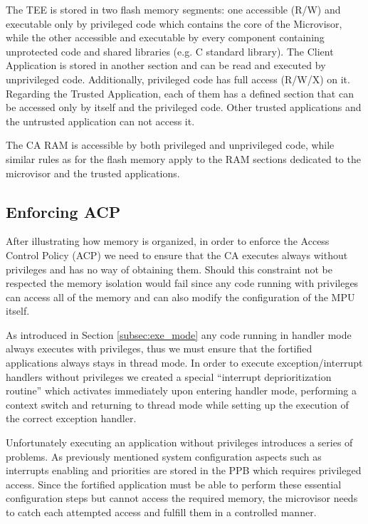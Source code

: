 \documentclass{article}
\begin{document}
The TEE is stored in two flash memory segments: one accessible (R/W) and executable only by privileged code which contains the core of the Microvisor, while the other accessible and executable by every component containing unprotected code and shared libraries (e.g. C standard library). The Client Application is stored in another section and can be read and executed by unprivileged code. Additionally, privileged code has full access (R/W/X) on it. Regarding the Trusted Application, each of them has a defined section that can be accessed only by itself and the privileged code. Other trusted applications and the untrusted application can not access it.   

The CA RAM is accessible by both privileged and unprivileged code, while similar rules as for the flash memory apply to the RAM sections dedicated to the microvisor and the trusted applications.

\subsection{Enforcing ACP}
After illustrating how memory is organized, in order to enforce the Access Control Policy (ACP) we need to ensure that the CA executes always without privileges and has no way of obtaining them. Should this constraint not be respected the memory isolation would fail since any code running with privileges can access all of the memory and can also modify the configuration of the MPU itself.

As introduced in Section \ref{subsec:exe_mode} any code running in handler mode always executes with privileges, thus we must ensure that the fortified applications always stays in thread mode. In order to execute exception/interrupt handlers without privileges we created a special ``interrupt deprioritization routine'' which activates immediately upon entering handler mode, performing a context switch and returning to thread mode while setting up the execution of the correct exception handler.

Unfortunately executing an application without privileges introduces a series of problems. As previously mentioned system configuration aspects such as interrupts enabling and priorities are stored in the PPB which requires privileged access. 
Since the fortified application must be able to perform these essential configuration steps but cannot access the required memory, the microvisor needs to catch each attempted access and fulfill them in a controlled manner.
\end{document}

